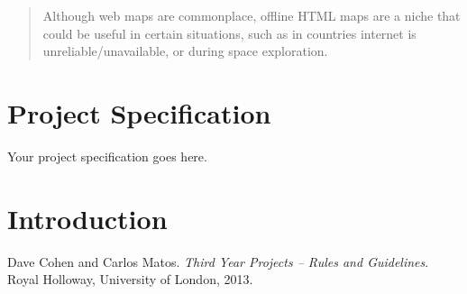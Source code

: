 \documentclass[]{final_report}
\def\studentname{George Honeywood}
\begin{document}
\maketitle













\tableofcontents{}\newpage


\begin{abstract}

Although web maps are commonplace, offline HTML maps are a niche that could be useful in certain situations, such as in countries internet is unreliable/unavailable, or during space exploration.

\end{abstract}
\newpage


\chapter*{Project Specification}
Your project specification goes here.

\chapter{Introduction}



\newpage
\begin{thebibliography}{99}
 Dave Cohen and Carlos Matos. \emph{Third Year Projects -- Rules and Guidelines}. Royal Holloway, University of London, 2013.
\end{thebibliography}
\label{endpage}
\end{document}
